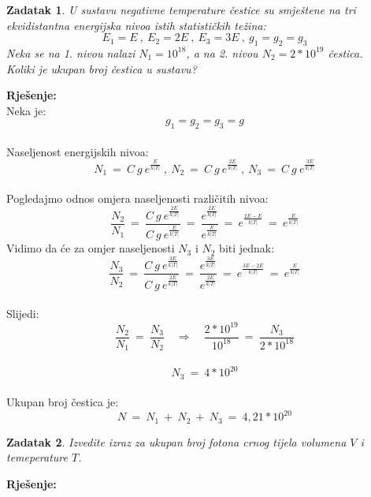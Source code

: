\documentclass[a4paper,12pt]{article}
\newtheorem{ZDK}{Zadatak}[section]
\begin{document}
\newpage
\begin{ZDK}
	U sustavu negativne temperature \v{c}estice su smje\v{s}tene na tri ekvidistantna energijska nivoa istih statisti\v{c}kih te\v{z}ina:
	$$ E_1=E\ ,\ E_2=2E\ ,\ E_3=3E\ ,\ g_1=g_2=g_3 $$
	Neka se na 1. nivou nalazi $N_1=10^{18}$, a na 2. nivou $N_2=2*10^{19}$ \v{c}estica. \\
	Koliki je ukupan broj \v{c}estica u sustavu?
\end{ZDK}
\textbf{Rje\v{s}enje:} \\
\newline
Neka je:
$$ g_1=g_2=g_3=g $$
\\
Naseljenost energijskih nivoa:
$$ N_1\ =\ C\ g\ e^{\frac{E}{k|T|}}\ ,\ N_2\ =\ C\ g\ e^{\frac{2E}{k|T|}}\ ,\ N_3\ =\ C\ g\ e^{\frac{3E}{k|T|}} $$
\\
Pogledajmo odnos omjera naseljenosti razli\v{c}itih nivoa:
$$ \frac{N_2}{N_1}\ =\ \frac{C\ g\ e^{\frac{2E}{k|T|}}}{C\ g\ e^{\frac{E}{k|T|}}}\ =\ \frac{e^{\frac{2E}{k|T|}}}{e^{\frac{E}{k|T|}}}\ =\ e^{\frac{2E-E}{k|T|}}\ =\ e^{\frac{E}{k|T|}} $$
Vidimo da \'ce za omjer naseljenosti $N_3$ i $N_2$ biti jednak:
$$ \frac{N_3}{N_2}\ =\ \frac{C\ g\ e^{\frac{3E}{k|T|}}}{C\ g\ e^{\frac{2E}{k|T|}}}\ =\ \frac{e^{\frac{3E}{k|T|}}}{e^{\frac{2E}{k|T|}}}\ =\ e^{\frac{3E-2E}{k|T|}}\ =\ e^{\frac{E}{k|T|}} $$
\\
Slijedi:
$$ \frac{N_2}{N_1}\ =\ \frac{N_3}{N_2} \quad \Rightarrow \quad \frac{2*10^{19}}{10^{18}}\ =\ \frac{N_3}{2*10^{18}} $$
\\
$$ N_3\ =\ 4*10^{20} $$
\\
Ukupan broj \v{c}estica je:
\\
$$ N\ =\ N_1\ +\ N_2\ +\ N_3\ =\ 4,21*10^{20} $$

\newpage
\begin{ZDK}
	Izvedite izraz za ukupan broj fotona crnog tijela volumena $V$ i temeperature $T$.
\end{ZDK}
\textbf{Rje\v{s}enje:} \\
\end{document}
